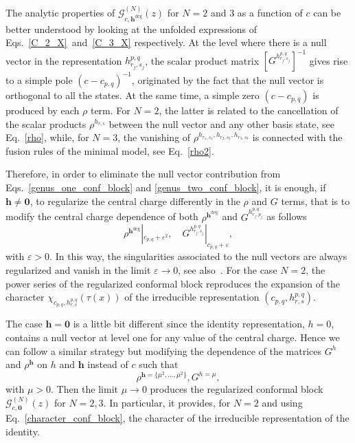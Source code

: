 \documentclass[a4paper,11pt]{article}
\begin{document}
The analytic properties of $\mathcal{G}_{c, \boldsymbol{h}^{\text{deg}}}^{(N)}(z)$ for $N=2$ and $3$ as a function of $c$ can be better understood by looking at the unfolded expressions of Eqs.~\eqref{C_2_X}~and~\eqref{C_3_X} respectively. At the level where there is a null vector in the representation $h_{r_j, s_j}^{p, q}$, the scalar product matrix $\left[G^{h^{p,q}_{r_j,s_j}}\right]^{-1}$ gives rise to a simple pole $(c-c_{p, q})^{-1}$, originated by the fact that the null vector is orthogonal to all the states.  At the same time, a simple zero $(c-c_{p,q})$ is produced by each $\rho$ term. For $N=2$, the latter is related to the cancellation of the scalar products $\rho^{h_{r,s}}$ between the null vector and any other basis state, see Eq.~\eqref{rho}, while, for $N= 3$, the vanishing of $\rho^{h_{r_1,s_1},h_{r_2,s_2},h_{r_3,s_3}}$ is connected with the fusion rules of the minimal model, see Eq.~\eqref{rho2}.  

Therefore, in order to eliminate the null vector contribution from Eqs.~\eqref{genus_one_conf_block} and \eqref{genus_two_conf_block}, 
it is enough, if $\boldsymbol{h}\neq \boldsymbol{0}$, to regularize the central charge differently in the $\rho$ and $G$ terms, 
that is to modify the central charge dependence of both $\rho^{\boldsymbol{h}^{\text{deg}}}$ and $G^{h_{r_j, p_j}^{p, q}}$ as follows
\begin{equation}\label{regularization}
 \rho^{\boldsymbol{h}^{\text{deg}}}|_{c_{p,q}+\varepsilon^2},\quad  G^{h_{r_j, s_j}^{p, q}}|_{c_{p,q}+\varepsilon},
\end{equation}
with $\varepsilon>0$. In this way, the singularities associated to the null vectors are always regularized and vanish 
in the limit $\varepsilon\to 0$, see also~\cite{SV}. For the case $N=2$, the power series of the regularized
conformal block reproduces the expansion of the character $\chi_{c_{p, q}, h_{r, s}^{p, q}}(\tau(x))$ of the irreducible 
representation $(c_{p, q}, h_{r, s}^{p, q})$.

The case $\boldsymbol{h}=\boldsymbol{0}$ is a little bit different since the identity representation,
$h=0$, contains a null vector at level one for any value of the central charge. Hence we can follow 
a similar strategy but modifying the dependence of the matrices $G^{h}$ and $\rho^{\boldsymbol{h}}$
on $h$ and $\boldsymbol{h}$ instead of $c$ such that
\begin{equation}\label{regularization_identity}
 \rho^{\boldsymbol{h}=\{\mu^2,\dots, \mu^2\}}, G^{h=\mu},
\end{equation}
with $\mu>0$. Then the limit $\mu\to 0$ produces the regularized conformal block 
$\mathcal{G}_{c, \boldsymbol{0}}^{(N)}(z)$ for $N=2,3$. In particular, it provides, 
for $N=2$ and using Eq.~\eqref{character_conf_block}, the  character of the irreducible 
representation of the identity.
\end{document}
